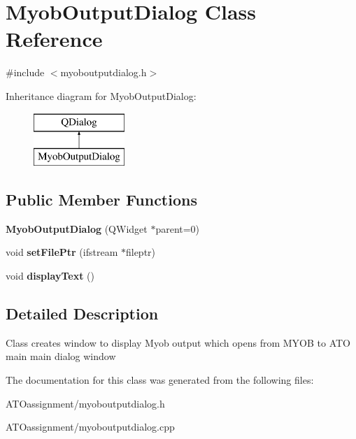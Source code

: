 \hypertarget{class_myob_output_dialog}{}\section{Myob\+Output\+Dialog Class Reference}
\label{class_myob_output_dialog}


{\ttfamily \#include $<$myoboutputdialog.\+h$>$}

Inheritance diagram for Myob\+Output\+Dialog\+:\begin{figure}[H]
\begin{center}
\leavevmode
\includegraphics[height=2.000000cm]{class_myob_output_dialog}
\end{center}
\end{figure}
\subsection*{Public Member Functions}
\begin{DoxyCompactItemize}
\item 
\hypertarget{class_myob_output_dialog_a3307f232864fc026f8613103d2d1c315}{}\label{class_myob_output_dialog_a3307f232864fc026f8613103d2d1c315} 
{\bfseries Myob\+Output\+Dialog} (Q\+Widget $\ast$parent=0)
\item 
\hypertarget{class_myob_output_dialog_a85ab59f127e9365f1abf16fd2e64007b}{}\label{class_myob_output_dialog_a85ab59f127e9365f1abf16fd2e64007b} 
void {\bfseries set\+File\+Ptr} (ifstream $\ast$fileptr)
\item 
\hypertarget{class_myob_output_dialog_a7cbc13e0ae61980a6b491034b85825ac}{}\label{class_myob_output_dialog_a7cbc13e0ae61980a6b491034b85825ac} 
void {\bfseries display\+Text} ()
\end{DoxyCompactItemize}


\subsection{Detailed Description}
Class creates window to display Myob output which opens from M\+Y\+OB to A\+TO main main dialog window 

The documentation for this class was generated from the following files\+:\begin{DoxyCompactItemize}
\item 
A\+T\+Oassignment/myoboutputdialog.\+h\item 
A\+T\+Oassignment/myoboutputdialog.\+cpp\end{DoxyCompactItemize}
